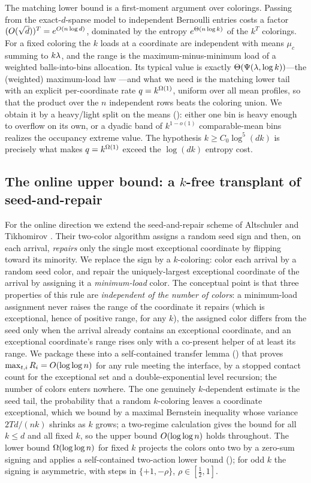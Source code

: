 The matching lower bound is a first-moment argument over colorings. Passing from the exact-$d$-sparse model to independent
Bernoulli entries costs a factor $(O(\sqrt d))^T=e^{O(n\log d)}$, dominated by the entropy $e^{\Theta(n\log k)}$ of the
$k^T$ colorings. For a fixed coloring the $k$ loads at a coordinate are independent with means $\mu_c$ summing to $k\lambda$, and
the range is the maximum-minus-minimum load of a weighted balls-into-bins allocation. Its typical value is exactly
$\Theta(\Psi(\lambda,\log k))$---the (weighted) maximum-load law \cite{ABKU1999,BCSV2006,RaabSteger1998}---and what we need is the
matching lower tail with an explicit per-coordinate rate $q=k^{\Omega(1)}$, uniform over all mean profiles, so that the product
over the $n$ independent rows beats the coloring union. We obtain it by a heavy/light split on the means
(): either one bin is heavy enough to overflow on its own, or a dyadic band of $k^{1-o(1)}$
comparable-mean bins realizes the occupancy extreme value. The hypothesis $k\ge C_0\log^5(dk)$ is precisely what makes
$q=k^{\Omega(1)}$ exceed the $\log(dk)$ entropy cost.

\subsection{The online upper bound: a $k$-free transplant of seed-and-repair}\label{sec:ov-online}

For the online direction we extend the seed-and-repair scheme of Altschuler and Tikhomirov \cite{AT2025}. Their two-color
algorithm assigns a random seed sign and then, on each arrival, \emph{repairs} only the single most exceptional coordinate by
flipping toward its minority. We replace the sign by a $k$-coloring: color each arrival by a random seed color, and repair the
uniquely-largest exceptional coordinate of the arrival by assigning it a \emph{minimum-load} color. The conceptual point is
that three properties of this rule are \emph{independent of the number of colors}: a minimum-load assignment never raises the
range of the coordinate it repairs (which is exceptional, hence of positive range, for any $k$), the assigned color differs
from the seed only when the arrival already contains an exceptional coordinate, and an exceptional coordinate's range rises
only with a co-present helper of at least its range. We package these into a self-contained transfer lemma ()
that proves $\max_{t,i}R_i=O(\log\log n)$ for any rule meeting the interface, by a stopped contact count for the
exceptional set and a double-exponential level recursion; the number of colors enters nowhere. The one genuinely
$k$-dependent estimate is the seed tail, the probability that a random $k$-coloring leaves a coordinate exceptional, which we
bound by a maximal Bernstein inequality whose variance $2Td/(nk)$ shrinks as $k$ grows; a two-regime calculation gives the
bound for all $k\le d$ and all fixed $k$, so the upper bound $O(\log\log n)$ holds throughout. The lower bound
$\Omega(\log\log n)$ for fixed $k$ projects the colors onto two by a zero-sum signing and applies a self-contained two-action
lower bound (); for odd $k$ the signing is asymmetric, with steps in $\{+1,-\rho\}$, $\rho\in[\tfrac12,1]$.

